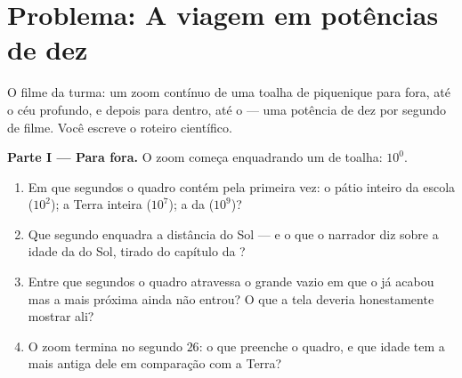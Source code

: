 \section{Problema: A viagem em potências de dez}

\begin{problem}\label{pb:g9:atoms-to-galaxies:1}
O filme da turma: um zoom contínuo de uma toalha de piquenique para
fora, até o céu profundo, e depois para dentro, até o  --- uma
potência de dez por segundo de filme. Você escreve o roteiro
científico.

\medskip\noindent\textbf{Parte I --- Para fora.}
O zoom começa enquadrando um  de toalha: $10^{0}$.
\begin{enumerate}
  \item Em que segundos o quadro contém pela primeira vez: o pátio
        inteiro da escola ($10^{2}$); a Terra inteira ($10^{7}$); a
         da  ($10^{9}$)?
  \item Que segundo enquadra a distância do Sol --- e o que o
        narrador diz sobre a idade da  do Sol, tirado do capítulo
        da ?
  \item Entre que segundos o quadro atravessa o grande vazio em que o
         já acabou mas a  mais próxima ainda não
        entrou? O que a tela deveria honestamente mostrar ali?
  \item O zoom termina no segundo $26$: o que preenche o quadro, e
        que idade tem a  mais antiga dele em comparação com a
        Terra?
\end{enumerate}


\end{problem}
